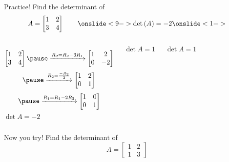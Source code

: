 \documentclass[xcoler=dvipsnames, aspectratio=169]{beamer}
\begin{document}
    \begin{frame}{Practice!}
        Find the determinant of 
        \[
            A = \begin{bmatrix}
                1 & 2\\
                3 & 4
            \end{bmatrix}\qquad\onslide<9->\det{A} = -2\onslide<1->
        \]\pause
        \begin{columns}
            \[
                \begin{bmatrix}
                    1 & 2\\
                    3 & 4
                \end{bmatrix}\pause\xrightarrow{R_2=R_2-3R_1}\begin{bmatrix}
                    1 & 2\\
                    0 & -2
                \end{bmatrix}
            \]
            \[
                \pause\xrightarrow{R_2=\frac{-R_2}{2}}\begin{bmatrix}
                    1 & 2\\
                    0 & 1
                \end{bmatrix}
            \]
            \[
                \pause\xrightarrow{R_1=R_1-2R_2}\begin{bmatrix}
                    1 & 0\\
                    0 & 1
                \end{bmatrix}
            \]
            $\det{A} = -2$
            \vspace{20pt}

            $\det{A} = 1$
            \vspace{20pt}

            $\det{A} = 1$

        \end{columns}
    \end{frame}
    \begin{frame}{Now you try!}
        Find the determinant of 
        \[
            A = \begin{bmatrix}
                1 & 2\\
                1 & 3
            \end{bmatrix}
        \]
        \vspace{130pt}
    \end{frame}
\end{document}
